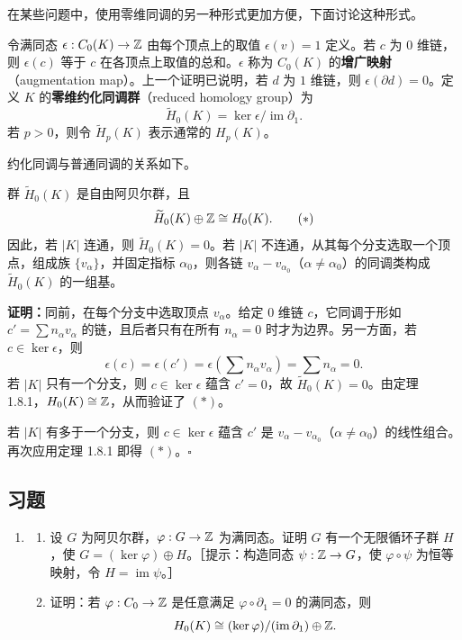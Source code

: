 在某些问题中，使用零维同调的另一种形式更加方便，下面讨论这种形式。

令满同态 $\epsilon:C_0(K)\to\mathbb{Z}$ 由每个顶点上的取值 $\epsilon(v)=1$ 定义。若 $c$ 为 $0$ 维链，则 $\epsilon(c)$ 等于 $c$ 在各顶点上取值的总和。$\epsilon$ 称为 $C_0(K)$ 的\textbf{增广映射}（augmentation map）。上一个证明已说明，若 $d$ 为 $1$ 维链，则 $\epsilon(\partial d)=0$。定义 $K$ 的\textbf{零维约化同调群}（reduced homology group）为
\[
\widetilde H_0(K)=\ker\epsilon/\operatorname{im}\partial_1.
\]
若 $p>0$，则令 $\widetilde H_p(K)$ 表示通常的 $H_p(K)$。

约化同调与普通同调的关系如下。

群 $\widetilde H_0(K)$ 是自由阿贝尔群，且
\[
\widetilde H_0(K)\oplus\mathbb{Z}\cong H_0(K).\tag{$*$}
\]
因此，若 $|K|$ 连通，则 $\widetilde H_0(K)=0$。若 $|K|$ 不连通，从其每个分支选取一个顶点，组成族 $\{v_\alpha\}$，并固定指标 $\alpha_0$，则各链 $v_\alpha-v_{\alpha_0}$（$\alpha\ne\alpha_0$）的同调类构成 $\widetilde H_0(K)$ 的一组基。

\noindent\textbf{证明：}同前，在每个分支中选取顶点 $v_\alpha$。给定 $0$ 维链 $c$，它同调于形如 $c'=\sum n_\alpha v_\alpha$ 的链，且后者只有在所有 $n_\alpha=0$ 时才为边界。另一方面，若 $c\in\ker\epsilon$，则
\[
\epsilon(c)=\epsilon(c')=\epsilon\left(\sum n_\alpha v_\alpha\right)=\sum n_\alpha=0.
\]
若 $|K|$ 只有一个分支，则 $c\in\ker\epsilon$ 蕴含 $c'=0$，故 $\widetilde H_0(K)=0$。由定理 1.8.1，$H_0(K)\cong\mathbb{Z}$，从而验证了 $(*)$。

若 $|K|$ 有多于一个分支，则 $c\in\ker\epsilon$ 蕴含 $c'$ 是 $v_\alpha-v_{\alpha_0}$（$\alpha\ne\alpha_0$）的线性组合。再次应用定理 1.8.1 即得 $(*)$。\hfill$\square$

\subsection*{习题}
\begin{enumerate}
\item \begin{enumerate}[label=(\alph*)]
\item 设 $G$ 为阿贝尔群，$\varphi:G\to\mathbb{Z}$ 为满同态。证明 $G$ 有一个无限循环子群 $H$，使 $G=(\ker\varphi)\oplus H$。［提示：构造同态 $\psi:\mathbb{Z}\to G$，使 $\varphi\circ\psi$ 为恒等映射，令 $H=\operatorname{im}\psi$。］
\item 证明：若 $\varphi:C_0\to\mathbb{Z}$ 是任意满足 $\varphi\circ\partial_1=0$ 的满同态，则
\[
H_0(K)\cong(\ker\varphi)/(\operatorname{im}\partial_1)\oplus\mathbb{Z}.
\]
\end{enumerate}
\end{enumerate}
